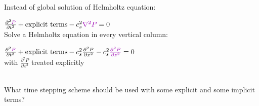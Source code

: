 \begin{slide}

Instead of global solution of Helmholtz equation:

$\frac{\partial^2 {\color{purple}P}}{\partial t^2}
+ \text{explicit terms}
- c_s^2 {\color{purple}\nabla^2 P}
=0$\\
\pauseHS
Solve a Helmholtz equation in every vertical column:

$\frac{\partial^2 {\color{purple}P}}{\partial t^2}
+ \text{explicit terms}
- c_s^2 \frac{\partial^2 P}{\partial x^2} - c_s^2{\color{purple} \frac{\partial^2 P}{\partial z^2}}
=0$\\


with $\frac{\partial^2 P}{\partial x^2}$ treated explicitly

\ \\
\pauseHS
What time stepping scheme should be used with some explicit and some implicit terms?

\end{slide}

